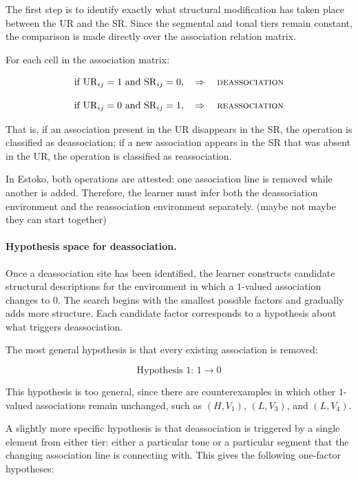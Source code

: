 \documentclass{article}[12pt]
\begin{document}
The first step is to identify exactly what structural modification has
taken place between the UR and the SR. Since the segmental and tonal
tiers remain constant, the comparison is made directly over the
association relation matrix.

For each cell in the association matrix:

\[
\text{if } \mathrm{UR}_{ij} = 1 \text{ and } \mathrm{SR}_{ij} = 0,
\quad \Rightarrow \quad \textsc{deassociation}
\]

\[
\text{if } \mathrm{UR}_{ij} = 0 \text{ and } \mathrm{SR}_{ij} = 1,
\quad \Rightarrow \quad \textsc{reassociation}
\]

That is, if an association present in the UR disappears in the SR, the
operation is classified as deassociation; if a new association appears
in the SR that was absent in the UR, the operation is classified as
reassociation.

In Estoko, both operations are attested: one association line is
removed while another is added. Therefore, the learner must infer both
the deassociation environment and the reassociation environment
separately. (maybe not maybe they can start together)

\paragraph{Hypothesis space for deassociation.}

Once a deassociation site has been identified, the learner constructs
candidate structural descriptions for the environment in which a
\(1\)-valued association changes to \(0\). The search begins with the
smallest possible factors and gradually adds more structure. Each
candidate factor corresponds to a hypothesis about what triggers
deassociation.

The most general hypothesis is that every existing association is
removed:

\[
\text{Hypothesis 1: } 1 \rightarrow 0
\]

This hypothesis is too general, since there are counterexamples in
which other \(1\)-valued associations remain unchanged, such as
\((H,V_1)\), \((L,V_3)\), and \((L,V_4)\).

A slightly more specific hypothesis is that deassociation is triggered
by a single element from either tier: either a particular tone or a particular segment that the
changing association line is connecting with.
This gives the following one-factor hypotheses:
\end{document}
